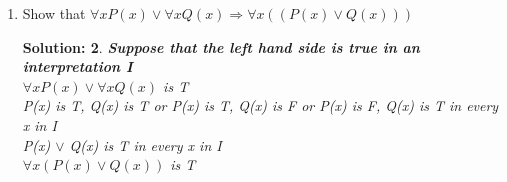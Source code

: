 \documentclass{article}
\theoremstyle{break}
\newtheorem*{solution*}{\textbf{Solution:} }
\begin{document}
\begin{enumerate}
        \begin{solution*}
                \leavevmode
                \begin{enumerate}[(1)]
                        \item \textbf{Show that $\exists x(P(x) \lor Q(x) ) \to \exists x P(x) \lor \exists x Q(x)$ is logically valid.}\\
                        Suppose that  $\exists x P(x) \lor \exists x Q(x)$ is F in an interpretation I\\
                        $P(x)$ is F and $Q(x)$ is F in an x in I\\
                        $x(P(x) \lor Q(x) )$ is F in the x in I\\
                        $\exists x(P(x) \lor Q(x) )$ is F in I\\
                        \item \textbf{Show that $\exists x P(x) \lor \exists x Q(x) \to \exists x(P(x) \lor Q(x) )$ is logically valid.}\\
                        Suppose that $\exists x P(x) \lor \exists x Q(x)$ is F in an interpretation in I\\
                        $P(x) \lor Q(x)$ is F in an x in I\\
                        $P(x)$ is F and $Q(x)$ is F in the x in I\\
                        $P(x)$ is F in an x in I and Q(x) is F in an x in I\\
                        $\exists x P(x) \lor \exists x Q(x) $ is F in I
                \end{enumerate}
        \end{solution*}
        \leavevmode
        \item Show that $\forall xP(x) \lor \forall x Q(x)  \Rightarrow \forall x ((P(x) \lor Q(x)))$
        \begin{solution*}
        \leavevmode
                \textbf{Suppose that the left hand side is true in an interpretation I}\\
                $\forall xP(x) \lor \forall x Q(x)$ is T\\
                P(x) is T, Q(x) is T or P(x) is T, Q(x) is F or P(x) is F, Q(x) is T in every x in I\\
                P(x) $\lor$ Q(x) is T in every x in I\\
                $\forall x (P(x) \lor Q(x))$ is T\\
        \end{solution*}
        

\end{enumerate}
\end{document}
